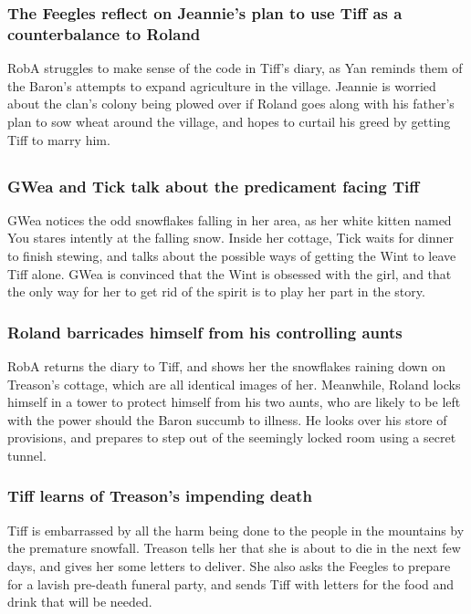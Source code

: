 \subsubsection{The Feegles reflect on \Gls{Jeannie}'s plan to use \Gls{Tiff} as a counterbalance
    to \Gls{Roland}}
\Gls{RobA} struggles to make sense of the code in \Gls{Tiff}'s diary, as \Gls{Yan} reminds them of
the \Gls{Baron}'s attempts to expand agriculture in the village. \Gls{Jeannie} is worried about the
clan's colony being plowed over if \Gls{Roland} goes along with his father's plan to sow wheat
around the village, and hopes to curtail his greed by getting \Gls{Tiff} to marry him.

\subsection{}
\subsubsection{\Gls{GWea} and \Gls{Tick} talk about the predicament facing \Gls{Tiff}}
\Gls{GWea} notices the odd snowflakes falling in her area, as her white kitten named \Gls{You}
stares intently at the falling snow. Inside her cottage, \Gls{Tick} waits for dinner to finish
stewing, and talks about the possible ways of getting the \Gls{Wint} to leave \Gls{Tiff} alone.
\Gls{GWea} is convinced that the \Gls{Wint} is obsessed with the girl, and that the only way for
her to get rid of the spirit is to play her part in the story.

\subsubsection{\Gls{Roland} barricades himself from his controlling aunts}
\Gls{RobA} returns the diary to \Gls{Tiff}, and shows her the snowflakes raining down on
\Gls{Treason}'s cottage, which are all identical images of her. Meanwhile, \Gls{Roland} locks
himself in a tower to protect himself from his two aunts, who are likely to be left with the power
should the \Gls{Baron} succumb to illness. He looks over his store of provisions, and prepares to
step out of the seemingly locked room using a secret tunnel.

\subsubsection{\Gls{Tiff} learns of \Gls{Treason}'s impending death}
\Gls{Tiff} is embarrassed by all the harm being done to the people in the mountains by the
premature snowfall. \Gls{Treason} tells her that she is about to die in the next few days, and
gives her some letters to deliver. She also asks the Feegles to prepare for a lavish pre-death
funeral party, and sends \Gls{Tiff} with letters for the food and drink that will be needed.

